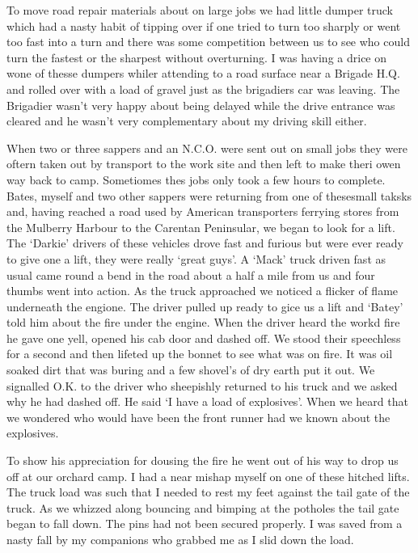 To move road repair materials about on large jobs we had little dumper
truck which had a nasty habit of tipping over if one tried to turn too
sharply or went too fast into a turn and there was some competition
between us to see who could turn the fastest or the sharpest without
overturning. I was having a drice on wone of thesse dumpers whiler
attending to a road surface near a Brigade H.Q. and rolled over with a
load of gravel just as the brigadiers car was leaving. The Brigadier
wasn't very happy about being delayed while the drive entrance was
cleared and he wasn't very complementary about my driving skill
either. 

When two or three sappers and an N.C.O. were sent out on small jobs
they were oftern taken out by transport to the work site and then left
to make theri owen way back to camp. Sometiomes thes jobs only took a
few hours to complete. \Lcorporal Bates, myself and two other sappers were
returning from one of thesesmall taksks and, having reached a road
used by American transporters ferrying stores from the Mulberry
Harbour to the Carentan Peninsular, we began to look for a lift. The
`Darkie' drivers of these vehicles drove fast and furious but were
ever ready to give one a lift, they were really `great guys'. A `Mack'
truck driven fast as usual came round a bend in the road about a half
a mile from us and four thumbs went into action. As the truck
approached we noticed a flicker of flame underneath the engione. The
driver pulled up ready to gice us a lift and `Batey' told him about
the fire under the engine. When the driver heard the workd fire he
gave one yell, opened his cab door and dashed off. We stood their
speechless for a second and then lifeted up the bonnet to see what was
on fire. It was oil soaked dirt that was buring and a few shovel's of
dry earth put it out. We signalled O.K. to the driver who sheepishly
returned to his truck and we asked why he had dashed off. He said `I
have a load of explosives'. When we heard that we wondered who would
have been the front runner had we known about the explosives.

To show his appreciation for dousing the fire he went out of his way
to drop us off at our orchard camp. I had a near mishap myself on one
of these hitched lifts. The truck load was such that I needed to rest
my feet against the tail gate of the truck. As we whizzed along
bouncing and bimping at the potholes the tail gate began to fall
down. The pins had not been secured properly. I was saved from a nasty
fall by my companions who grabbed me as I slid down the load.

